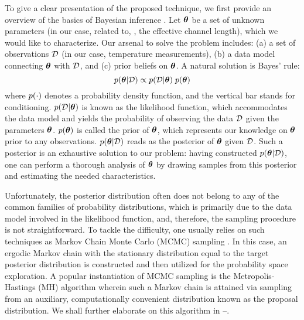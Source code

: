 To give a clear presentation of the proposed technique, we first provide an overview of the basics of Bayesian inference \cite{gelman2004}.
Let ${\boldsymbol\theta}$ be a set of unknown parameters (in our case, related to, \eg, the effective channel length), which we would like to characterize. Our arsenal to solve the problem includes: (a) a set of observations $\mathcal{D}$ (in our case, temperature measurements), (b) a data model connecting ${\boldsymbol\theta}$ with $\mathcal{D}$, and (c) prior beliefs on ${\boldsymbol\theta}$. A natural solution is Bayes' rule:
\begin{equation} \elabel{bayes}
  \f{\vparam | \Data} \propto \f{\Data | \vparam} \; \f{\vparam}
\end{equation}
where $\f{\cdot}$ denotes a probability density function, and the vertical bar stands for conditioning.
$\f{\Data | \vparam}$ is known as the likelihood function, which accommodates the data model and yields the probability of observing the data $\mathcal{D}$ given the parameters ${\boldsymbol\theta}$.
$\f{\vparam}$ is called the prior of ${\boldsymbol\theta}$, which represents our knowledge on ${\boldsymbol\theta}$ prior to any observations.
$\f{\vparam | \Data}$ reads as the posterior of ${\boldsymbol\theta}$ given $\mathcal{D}$. Such a posterior is an exhaustive solution to our problem: having constructed $\f{\vparam | \Data}$, one can perform a thorough analysis of ${\boldsymbol\theta}$ by drawing samples from this posterior and estimating the needed characteristics.

Unfortunately, the posterior distribution often does not belong to any of the common families of probability distributions, which is primarily due to the data model involved in the likelihood function, and, therefore, the sampling procedure is not straightforward.
To tackle the difficulty, one usually relies on such techniques as Markov Chain Monte Carlo (MCMC) sampling \cite{gelman2004}. In this case, an ergodic Markov chain with the stationary distribution equal to the target posterior distribution is constructed and then utilized for the probability space exploration.
A popular instantiation of MCMC sampling is the Metropolis-Hastings (MH) algorithm wherein such a Markov chain is attained via sampling from an auxiliary, computationally convenient distribution known as the proposal distribution. We shall further elaborate on this algorithm in --.
